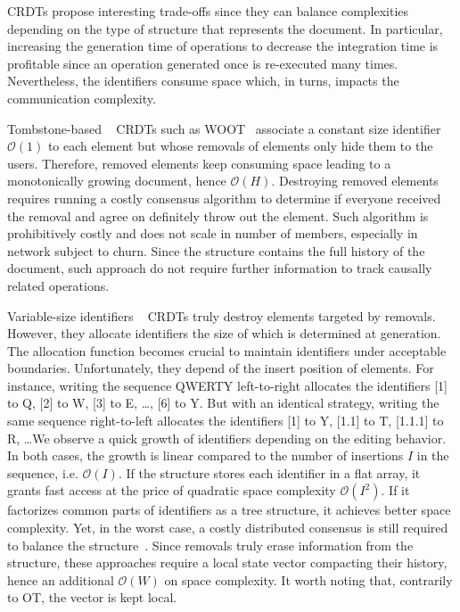 \begin{asparadesc}
  CRDTs propose interesting trade-offs since they can balance complexities
  depending on the type of structure that represents the document.  In
  particular, increasing the generation time of operations to decrease the
  integration time is profitable since an operation generated once is
  re-executed many times. Nevertheless, the identifiers consume space which, in
  turns, impacts the communication complexity.

\item [Tombstone-based]~\cite{ahmed2011evaluating, conway2014language,
    grishchenko2010deep, oster2006data, roh2011replicated, weiss2007wooki,
    wu2010partial, yu2012stringwise} CRDTs such as WOOT~\cite{oster2006data}
  associate a constant size identifier $\mathcal{O}(1)$ to each element but
  whose removals of elements only hide them to the users. Therefore, removed
  elements keep consuming space leading to a monotonically growing document,
  hence $\mathcal{O}(H)$.  Destroying removed elements requires running a costly
  consensus algorithm to determine if everyone received the removal and agree on
  definitely throw out the element. Such algorithm is prohibitively costly and
  does not scale in number of members, especially in network subject to
  churn. Since the structure contains the full history of the document, such
  approach do not require further information to track causally related
  operations.

\item [Variable-size identifiers]~\cite{mehdi2014merging, nedelec2013lseq,
    preguica2009commutative, weiss2009logoot} CRDTs truly destroy elements
  targeted by removals. However, they allocate identifiers the size of which is
  determined at generation. The allocation function becomes crucial to maintain
  identifiers under acceptable boundaries. Unfortunately, they depend of the
  insert position of elements. For instance, writing the sequence QWERTY
  left-to-right allocates the identifiers [1] to Q, [2] to W, [3] to E, \ldots,
  [6] to Y. But with an identical strategy, writing the same sequence
  right-to-left allocates the identifiers [1] to Y, [1.1] to T, [1.1.1] to R,
  \ldots We observe a quick growth of identifiers depending on the editing
  behavior. In both cases, the growth is linear compared to the number of
  insertions $I$ in the sequence, i.e. $\mathcal{O}(I)$. If the structure stores
  each identifier in a flat array, it grants fast access at the price of
  quadratic space complexity $\mathcal{O}(I^2)$. If it factorizes common parts
  of identifiers as a tree structure, it achieves better space complexity. Yet,
  in the worst case, a costly distributed consensus is still required to balance
  the structure~\cite{zawirski2011asynchronous}. Since removals truly erase
  information from the structure, these approaches require a local state vector
  compacting their history, hence an additional $\mathcal{O}(W)$ on space
  complexity. It worth noting that, contrarily to OT, the vector is kept local.


\end{asparadesc}
